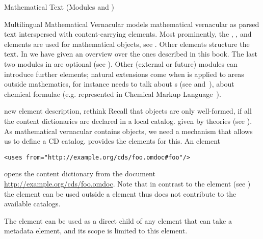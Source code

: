 \begin{tchapter}[id=mtxt,short=Mathematical Text]{Mathematical Text (Modules
  {} and {})}
\begin{tsection}[id=mtext]{Multilingual Mathematical Vernacular}
  {\omdoc} models mathematical vernacular as parsed text interspersed with
  content-carrying elements. Most prominently, the {},
  {}, and {} elements are used for mathematical
  objects, see {}. Other elements structure the text. In
  {} we have given an overview over the ones described in this
  book. The last two modules in {} are optional (see
  {}).  Other (external or future) {\omdoc} modules can introduce
  further elements; natural extensions come when {\omdoc} is applied to areas outside
  mathematics, for instance {} needs to talk about
  {s} (see {} and~\cite{Kohlhase:codemlspec}),
  {} about chemical formulae (e.g. represented in Chemical
  Markup Language~\cite{CML:online}).

  \begin{newpart}{new element description, rethink}
    Recall that \openmath objects are only well-formed, if all the content dictionaries
    are declared in a local catalog. given by \omdoc theories (see ). As mathematical
    vernacular contains \openmath objects, we need a mechanism that allows us to define a
    CD catalog. \omdoc provides the  elements for this. An element
\begin{lstlisting}[label=lst:uses,
  caption={Opening a CD Catalog},
  index={uses}]
<uses from="http://example.org/cds/foo.omdoc#foo"/>
\end{lstlisting}
opens the \omdoc content dictionary  from the \omdoc document
\url{http://example.org/cds/foo.omdoc}. Note that in contrast to the 
element (see ) the  element can be used outside a
 element thus does not contribute to the available catalogs.

The  element can be used as a direct child of any \omdoc element that can
take a metadata element, and its scope is limited to this element.
\end{newpart}


\end{tsection}
\end{tchapter}
